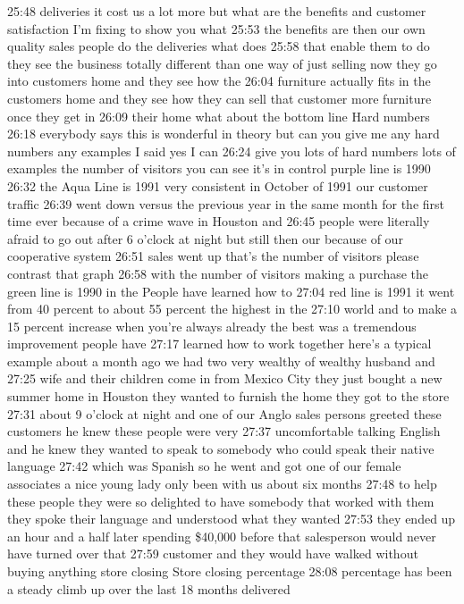 \documentclass[
]{book}
\begin{document}
25:48
deliveries it cost us a lot more but what are the benefits and customer satisfaction I'm fixing to show you what
25:53
the benefits are then our own quality sales people do the deliveries what does
25:58
that enable them to do they see the business totally different than one way of just selling now they go into customers home and they see how the
26:04
furniture actually fits in the customers home and they see how they can sell that customer more furniture once they get in
26:09
their home what about the bottom line
Hard numbers
26:18
everybody says this is wonderful in theory but can you give me any hard numbers any examples I said yes I can
26:24
give you lots of hard numbers lots of examples the number of visitors you can see it's in control purple line is 1990
26:32
the Aqua Line is 1991 very consistent in October of 1991 our customer traffic
26:39
went down versus the previous year in the same month for the first time ever because of a crime wave in Houston and
26:45
people were literally afraid to go out after 6 o'clock at night but still then our because of our cooperative system
26:51
sales went up that's the number of visitors please contrast that graph
26:58
with the number of visitors making a purchase the green line is 1990 in the
People have learned how to
27:04
red line is 1991 it went from 40 percent to about 55 percent the highest in the
27:10
world and to make a 15 percent increase when you're always already the best was a tremendous improvement people have
27:17
learned how to work together here's a typical example about a month ago we had two very wealthy of wealthy husband and
27:25
wife and their children come in from Mexico City they just bought a new summer home in Houston they wanted to furnish the home they got to the store
27:31
about 9 o'clock at night and one of our Anglo sales persons greeted these customers he knew these people were very
27:37
uncomfortable talking English and he knew they wanted to speak to somebody who could speak their native language
27:42
which was Spanish so he went and got one of our female associates a nice young lady only been with us about six months
27:48
to help these people they were so delighted to have somebody that worked with them they spoke their language and understood what they wanted
27:53
they ended up an hour and a half later spending \$40,000 before that salesperson would never have turned over that
27:59
customer and they would have walked without buying anything store closing
Store closing percentage
28:08
percentage has been a steady climb up over the last 18 months delivered
\end{document}
